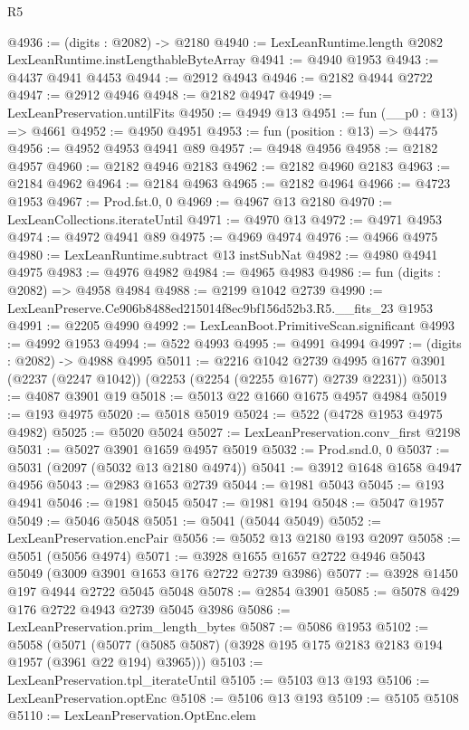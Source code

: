 \begin{lexlean}{R5}
\begin{coremodule}
@4936 := (digits : @2082) -> @2180
@4940 := LexLeanRuntime.length @2082 LexLeanRuntime.instLengthableByteArray
@4941 := @4940 @1953
@4943 := @4437 @4941 @4453
@4944 := @2912 @4943
@4946 := @2182 @4944 @2722
@4947 := @2912 @4946
@4948 := @2182 @4947
@4949 := LexLeanPreservation.untilFits
@4950 := @4949 @13
@4951 := fun (__p0 : @13) => @4661
@4952 := @4950 @4951
@4953 := fun (position : @13) => @4475
@4956 := @4952 @4953 @4941 @89
@4957 := @4948 @4956
@4958 := @2182 @4957
@4960 := @2182 @4946 @2183
@4962 := @2182 @4960 @2183
@4963 := @2184 @4962
@4964 := @2184 @4963
@4965 := @2182 @4964
@4966 := @4723 @1953
@4967 := Prod.fst.{0, 0}
@4969 := @4967 @13 @2180
@4970 := LexLeanCollections.iterateUntil
@4971 := @4970 @13
@4972 := @4971 @4953
@4974 := @4972 @4941 @89
@4975 := @4969 @4974
@4976 := @4966 @4975
@4980 := LexLeanRuntime.subtract @13 instSubNat
@4982 := @4980 @4941 @4975
@4983 := @4976 @4982
@4984 := @4965 @4983
@4986 := fun (digits : @2082) => @4958 @4984
@4988 := @2199 @1042 @2739
@4990 := LexLeanPreserve.Ce906b8488ed215014f8ec9bf156d52b3.R5.__fits_23 @1953
@4991 := @2205 @4990
@4992 := LexLeanBoot.PrimitiveScan.significant
@4993 := @4992 @1953
@4994 := @522 @4993
@4995 := @4991 @4994
@4997 := (digits : @2082) -> @4988 @4995
@5011 := @2216
    @1042
    @2739
    @4995
    @1677
    @3901
    (@2237 (@2247 @1042))
    (@2253 (@2254 (@2255 @1677) @2739 @2231))
@5013 := @4087 @3901 @19
@5018 := @5013 @22 @1660 @1675 @4957 @4984
@5019 := @193 @4975
@5020 := @5018 @5019
@5024 := @522 (@4728 @1953 @4975 @4982)
@5025 := @5020 @5024
@5027 := LexLeanPreservation.conv_first @2198
@5031 := @5027 @3901 @1659 @4957 @5019
@5032 := Prod.snd.{0, 0}
@5037 := @5031 (@2097 (@5032 @13 @2180 @4974))
@5041 := @3912 @1648 @1658 @4947 @4956
@5043 := @2983 @1653 @2739
@5044 := @1981 @5043
@5045 := @193 @4941
@5046 := @1981 @5045
@5047 := @1981 @194
@5048 := @5047 @1957
@5049 := @5046 @5048
@5051 := @5041 (@5044 @5049)
@5052 := LexLeanPreservation.encPair
@5056 := @5052 @13 @2180 @193 @2097
@5058 := @5051 (@5056 @4974)
@5071 := @3928 @1655 @1657 @2722 @4946 @5043 @5049 (@3009 @3901 @1653 @176 @2722 @2739 @3986)
@5077 := @3928 @1450 @197 @4944 @2722 @5045 @5048
@5078 := @2854 @3901
@5085 := @5078 @429 @176 @2722 @4943 @2739 @5045 @3986
@5086 := LexLeanPreservation.prim_length_bytes
@5087 := @5086 @1953
@5102 := @5058
    (@5071 (@5077 (@5085 @5087) (@3928 @195 @175 @2183 @2183 @194 @1957 (@3961 @22 @194) @3965)))
@5103 := LexLeanPreservation.tpl_iterateUntil
@5105 := @5103 @13 @193
@5106 := LexLeanPreservation.optEnc
@5108 := @5106 @13 @193
@5109 := @5105 @5108
@5110 := LexLeanPreservation.OptEnc.elem

\end{coremodule}
\end{lexlean}

